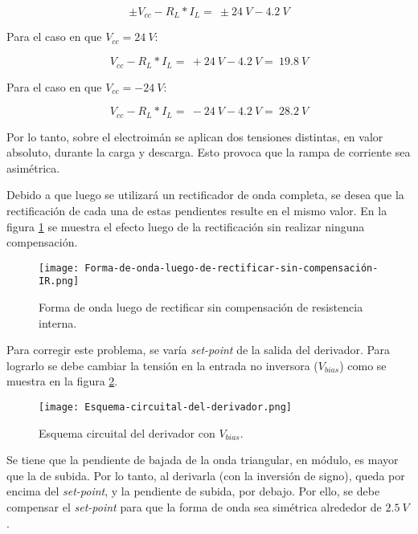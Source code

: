 \begin{equation} \label{eq_Vbus-didt-RL-2}
	\pm V_{cc}-R_L*I_L=\ \pm 24\:V-4.2\:V
\end{equation}

Para el caso en que $V_{cc}=24\:V$:

\begin{equation} \label{eq_Vbus-didt-RL-3}
	V_{cc}-R_L*I_L=\ +24\:V-4.2\:V=\ 19.8\:V
\end{equation}

Para el caso en que $V_{cc}=-24\:V$:

\begin{equation} \label{eq_Vbus-didt-RL-4}
	V_{cc}-R_L*I_L=\ -24\:V-4.2\:V=\ 28.2\:V
\end{equation}

Por lo tanto, sobre el electroimán se aplican dos tensiones distintas, en valor absoluto, durante la carga y descarga. Esto provoca que la rampa de corriente sea asimétrica.

Debido a que luego se utilizará un rectificador de onda completa, se desea que la rectificación de cada una de estas pendientes resulte en el mismo valor. En la figura \ref{fig:img_Forma-de-onda-luego-de-rectificar-sin-compensación-IR} se muestra el efecto luego de la rectificación sin realizar ninguna compensación.

\begin{figure}[H]
	\centering
	\texttt{[image: Forma-de-onda-luego-de-rectificar-sin-compensación-IR.png]}
	\caption{Forma de onda luego de rectificar sin compensación de resistencia interna.}
	\label{fig:img_Forma-de-onda-luego-de-rectificar-sin-compensación-IR}
\end{figure}

Para corregir este problema, se varía \textsl{set-point} de la salida del derivador. Para lograrlo se debe cambiar la tensión en la entrada no inversora ($V_{bias}$) como se muestra en la figura \ref{fig:img_Esquema-circuital-del-derivador}. 

\begin{figure}[H]
	\centering
	\texttt{[image: Esquema-circuital-del-derivador.png]}
	\caption{Esquema circuital del derivador con $V_{bias}$.}
	\label{fig:img_Esquema-circuital-del-derivador}
\end{figure}

Se tiene que la pendiente de bajada de la onda triangular, en módulo, es mayor que la de subida. Por lo tanto, al derivarla (con la inversión de signo), queda por encima del \textsl{set-point}, y la pendiente de subida, por debajo. Por ello, se debe compensar el \textsl{set-point} para que la forma de onda sea simétrica alrededor de $2.5\:V$. 

